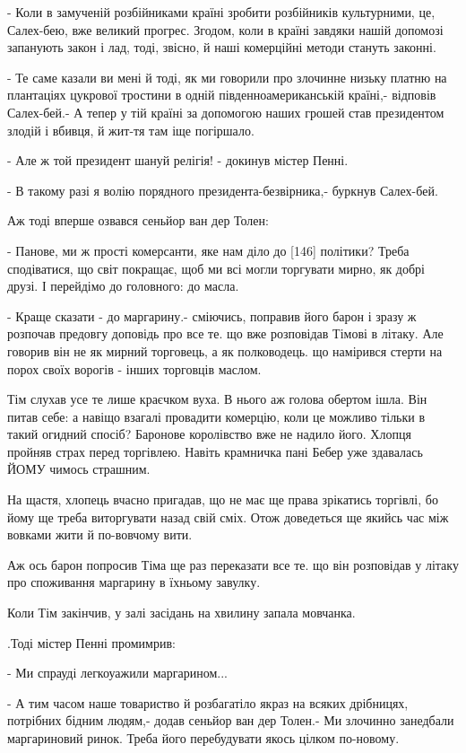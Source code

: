 - Коли в замученій розбійниками країні зробити розбійників культурними, це, Салех-бею, вже великий прогрес. Згодом, коли в країні завдяки нашій допомозі запанують закон і лад, тоді, звісно, й наші комерційні методи стануть законні.

- Те саме казали ви мені й тоді, як ми говорили про злочинне низьку платню на плантаціях цукрової тростини в одній південноамериканській країні,- відповів Салех-бей.- А тепер у тій країні за допомогою наших грошей став президентом злодій і вбивця, й жит-тя там іще погіршало.

- Але ж той президент шануй релігія! - докинув містер Пенні.

- В такому разі я волію порядного президента-безвірника,- буркнув Салех-бей.

Аж тоді вперше озвався сеньйор ван дер Толен:

- Панове, ми ж прості комерсанти, яке нам діло до [146] політики? Треба сподіватися, що світ покращає, щоб ми всі могли торгувати мирно, як добрі друзі. І перейдімо до головного: до масла.

- Краще сказати - до маргарину.- сміючись, поправив його барон і зразу ж розпочав предовгу доповідь про все те. що вже розповідав Тімові в літаку. Але говорив він не як мирний торговець, а як полководець. що намірився стерти на порох своїх ворогів - інших торговців маслом.

Тім слухав усе те лише краєчком вуха. В нього аж голова обертом ішла. Він питав себе: а навіщо взагалі провадити комерцію, коли це можливо тільки в такий огидний спосіб? Баронове королівство вже не надило його. Хлопця пройняв страх перед торгівлею. Навіть крамничка пані Бебер уже здавалась ЙОМУ чимось страшним.

На щастя, хлопець вчасно пригадав, що не має ще права зрікатись торгівлі, бо йому ще треба виторгувати назад свій сміх. Отож доведеться ще якийсь час між вовками жити й по-вовчому вити.

Аж ось барон попросив Тіма ще раз переказати все те. що він розповідав у літаку про споживання маргарину в їхньому завулку.

Коли Тім закінчив, у залі засідань на хвилину запала мовчанка.

.Тоді містер Пенні промимрив:

- Ми спрауді легкоуажили маргарином...

- А тим часом наше товариство й розбагатіло якраз на всяких дрібницях, потрібних бідним людям,- додав сеньйор ван дер Толен.- Ми злочинно занедбали маргариновий ринок. Треба його перебудувати якось цілком по-новому.

